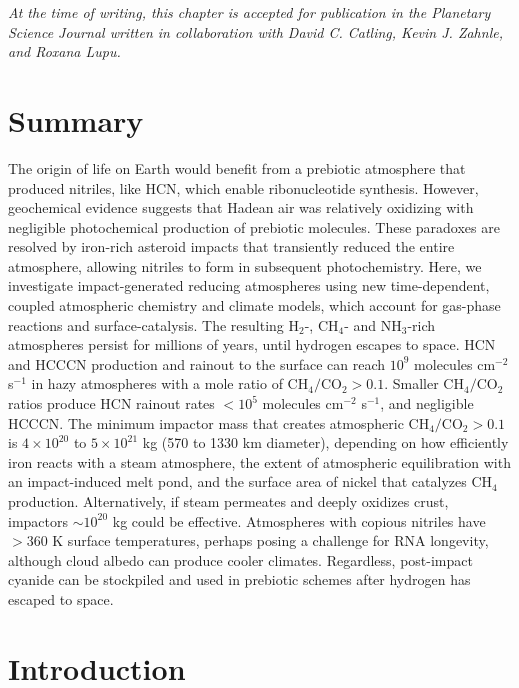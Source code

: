 \renewcommand\hl[1]{#1}
\renewcommand\mbox[1]{#1}

\noindent \textit{At the time of writing, this chapter is accepted for publication in the Planetary Science Journal written in collaboration with David C. Catling, Kevin J. Zahnle, and Roxana Lupu.}

\section*{\centering Summary}

The origin of life on Earth would benefit from a prebiotic atmosphere that produced nitriles, like HCN, which enable ribonucleotide synthesis. However, geochemical evidence suggests that Hadean air was relatively oxidizing with negligible photochemical production of prebiotic molecules. These paradoxes are resolved by iron-rich asteroid impacts that transiently reduced the entire atmosphere, allowing nitriles to form in subsequent photochemistry. Here, we investigate impact-generated reducing atmospheres using new time-dependent, coupled atmospheric chemistry and climate models, which account for gas-phase reactions and surface-catalysis. The resulting H$_2$-, CH$_4$- and NH$_3$-rich atmospheres persist for millions of years, until hydrogen escapes to space. HCN and HCCCN production and rainout to the surface can reach $10^9$ molecules cm$^{-2}$ s$^{-1}$ in hazy atmospheres with a mole ratio of $\mathrm{CH_4} / \mathrm{CO_2} > 0.1$. Smaller $\mathrm{CH_4} / \mathrm{CO_2}$ ratios produce HCN rainout rates $< 10^5$ molecules cm$^{-2}$ s$^{-1}$, and negligible HCCCN. The minimum impactor mass that creates atmospheric $\mathrm{CH_4} / \mathrm{CO_2} > 0.1$ is $4 \times 10^{20}$ to $5 \times 10^{21}$ kg (570 to 1330 km diameter), depending on how efficiently iron reacts with a steam atmosphere, the extent of atmospheric equilibration with an impact-induced melt pond, and the surface area of nickel that catalyzes CH$_4$ production. Alternatively, if steam permeates and deeply oxidizes crust, impactors $\sim 10^{20}$ kg could be effective. Atmospheres with copious nitriles have $> 360$ K surface temperatures, perhaps posing a challenge for RNA longevity, although cloud albedo can produce cooler climates. Regardless, post-impact cyanide can be stockpiled and used in prebiotic schemes after hydrogen has escaped to space.

\section{Introduction}

